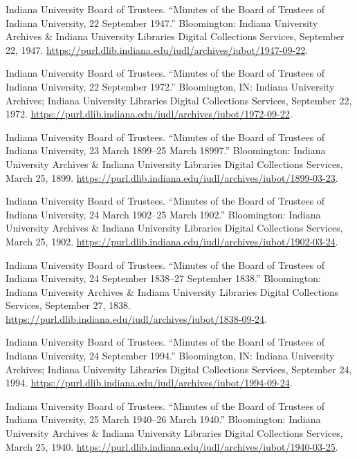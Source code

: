 \documentclass[
  american,
  letterpaper,
]{scrreprt}
\newlength{\cslhangindent}
\newenvironment{CSLReferences}[2] %
 {\begin{list}{}{%
  \setlength{\itemindent}{0pt}
  \setlength{\leftmargin}{0pt}
  \setlength{\parsep}{0pt}
  \ifodd #1
   \setlength{\leftmargin}{\cslhangindent}
   \setlength{\itemindent}{-1\cslhangindent}
  \fi
  \setlength{\itemsep}{#2\baselineskip}}}
 {\end{list}}
\begin{document}
\begin{CSLReferences}{1}{0}
Indiana University Board of Trustees. {``Minutes of the Board of
Trustees of Indiana University, 22 September 1947.''} Bloomington:
Indiana University Archives \& Indiana University Libraries Digital
Collections Services, September 22, 1947.
\url{https://purl.dlib.indiana.edu/iudl/archives/iubot/1947-09-22}.

Indiana University Board of Trustees. {``Minutes of the Board of
Trustees of Indiana University, 22 September 1972.''} Bloomington, IN:
Indiana University Archives; Indiana University Libraries Digital
Collections Services, September 22, 1972.
\url{https://purl.dlib.indiana.edu/iudl/archives/iubot/1972-09-22}.

Indiana University Board of Trustees. {``Minutes of the Board of
Trustees of Indiana University, 23 March 1899--25 March 18997.''}
Bloomington: Indiana University Archives \& Indiana University Libraries
Digital Collections Services, March 25, 1899.
\url{https://purl.dlib.indiana.edu/iudl/archives/iubot/1899-03-23}.

Indiana University Board of Trustees. {``Minutes of the Board of
Trustees of Indiana University, 24 March 1902--25 March 1902.''}
Bloomington: Indiana University Archives \& Indiana University Libraries
Digital Collections Services, March 25, 1902.
\url{https://purl.dlib.indiana.edu/iudl/archives/iubot/1902-03-24}.

Indiana University Board of Trustees. {``Minutes of the Board of
Trustees of Indiana University, 24 September 1838--27 September 1838.''}
Bloomington: Indiana University Archives \& Indiana University Libraries
Digital Collections Services, September 27, 1838.
\url{https://purl.dlib.indiana.edu/iudl/archives/iubot/1838-09-24}.

Indiana University Board of Trustees. {``Minutes of the Board of
Trustees of Indiana University, 24 September 1994.''} Bloomington, IN:
Indiana University Archives; Indiana University Libraries Digital
Collections Services, September 24, 1994.
\url{https://purl.dlib.indiana.edu/iudl/archives/iubot/1994-09-24}.

Indiana University Board of Trustees. {``Minutes of the Board of
Trustees of Indiana University, 25 March 1940--26 March 1940.''}
Bloomington: Indiana University Archives \& Indiana University Libraries
Digital Collections Services, March 25, 1940.
\url{https://purl.dlib.indiana.edu/iudl/archives/iubot/1940-03-25}.


\end{CSLReferences}
\end{document}
